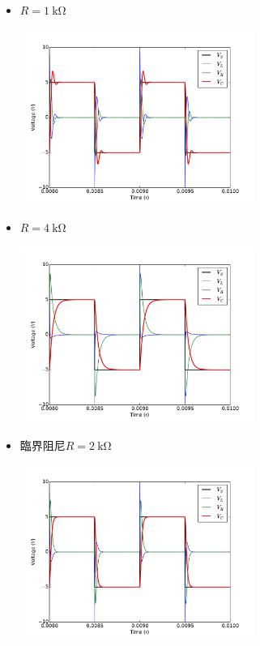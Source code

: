 \documentclass[12pt, a4paper]{article}
\begin{document}
\begin{enumerate}[itemsep=20pt, topsep=10pt]
      \begin{itemize}
        \item $R = \SI{1}\kohm$
      \begin{center}
        \includegraphics[width=0.6\textwidth]{data/plt1.pdf}
      \end{center}
        \item $R = \SI{4}\kohm$
      \begin{center}
        \includegraphics[width=0.6\textwidth]{data/plt3.pdf}
      \end{center}
        \item 臨界阻尼$R = \SI{2}\kohm$
      \begin{center}
        \includegraphics[width=0.6\textwidth]{data/plt2.pdf}
      \end{center}
  \end{itemize}
  
  \end{enumerate}
\end{document}
